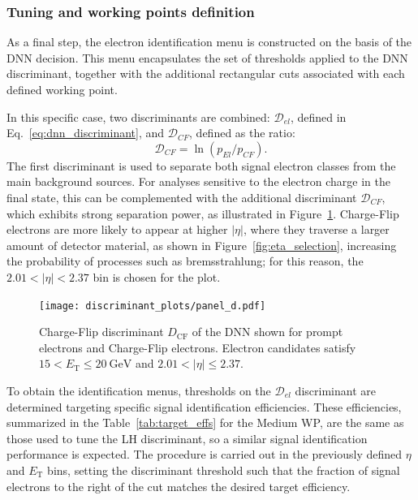 \subsubsection{Tuning and working points definition}
\label{dnn:tuning}

As a final step, the electron identification menu is constructed on the basis of the DNN decision. This menu encapsulates the set of thresholds applied to the DNN discriminant, together with the additional rectangular cuts associated with each defined working point.

In this specific case, two discriminants are combined: $\mathcal{D}_{el}$, defined in Eq.~\ref{eq:dnn_discriminant}, and $\mathcal{D}_{CF}$, defined as the ratio:
\begin{equation}
  \mathcal{D}_{CF} = \ln\left(p_{El}/p_{CF}\right).
\label{cf_disc}
\end{equation}
The first discriminant is used to separate both signal electron classes from the main background sources. For analyses sensitive to the electron charge in the final state, this can be complemented with the additional discriminant $\mathcal{D}_{CF}$, which exhibits strong separation power, as illustrated in Figure~\ref{fig:cf_discriminant}. Charge-Flip electrons are more likely to appear at higher $|\eta|$, where they traverse a larger amount of detector material, as shown in Figure~\ref{fig:eta_selection}, increasing the probability of processes such as bremsstrahlung; for this reason, the $2.01 < |\eta| < 2.37$ bin is chosen for the plot.

\begin{figure}[htbp]
  \centering
  \texttt{[image: discriminant\_plots/panel\_d.pdf]}
  \caption{Charge-Flip discriminant $D_{\mathrm{CF}}$ of the DNN shown for prompt electrons and
  Charge-Flip electrons. Electron candidates satisfy $15<E_{\text{T}}\leq 20~\mathrm{GeV}$ and $2.01<|\eta|\leq 2.37$.}
  \label{fig:cf_discriminant}
\end{figure}

To obtain the identification menus, thresholds on the $\mathcal{D}_{el}$ discriminant are determined targeting specific signal identification efficiencies. These efficiencies, summarized in the Table~\ref{tab:target_effs} for the Medium WP, are the same as those used to tune the LH discriminant, so a similar signal identification performance is expected. The procedure is carried out in the previously defined $\eta$ and $E_{\text{T}}$ bins, setting the discriminant threshold such that the fraction of signal electrons to the right of the cut matches the desired target efficiency.

